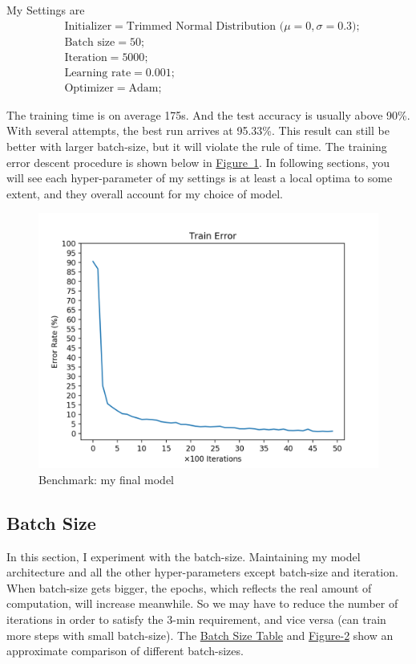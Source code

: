 \documentclass{article}
\begin{document}
My Settings are
\begin{equation}
\begin{aligned}
	& \text{Initializer} = \text{Trimmed Normal Distribution ($\mu=0, \sigma=0.3$)}; \\
	& \text{Batch size} = 50; \\
	& \text{Iteration} = 5000; \\
	& \text{Learning rate} = 0.001; \\
	& \text{Optimizer} = \text{Adam}; \label{base}
\end{aligned}
\end{equation}

The training time is on average 175s. And the test accuracy is usually above 90\%. With several attempts, the best run arrives at 95.33\%. This result can still be better with larger batch-size, but it will violate the rule of time. The training error descent procedure is shown below in \hyperref[fig-1]{Figure~1}. In following sections, you will see each hyper-parameter of my settings is at least a local optima to some extent, and they overall account for my choice of model.

\begin{figure}
	\centering
	\includegraphics[scale=0.5]{my.png}
	\caption{Benchmark: my final model}
	\label{fig-1}
\end{figure}


\subsection{Batch Size}
In this section, I experiment with the batch-size. Maintaining my model architecture and all the other hyper-parameters except batch-size and iteration. When batch-size gets bigger, the epochs, which reflects the real amount of computation, will increase meanwhile. So we may have to reduce the number of iterations in order to satisfy the 3-min requirement, and vice versa (can train more steps with small batch-size). The \hyperref[tab-2]{Batch Size Table} and \hyperref[fig-2]{Figure-2} show an approximate comparison of different batch-sizes.
\end{document}
